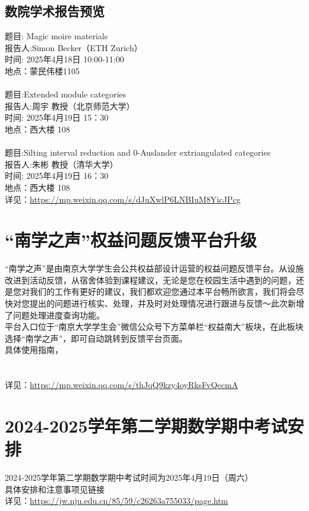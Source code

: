 \documentclass[letterpaper, 12pt]{article}
\begin{document}
\begin{multicols}{2}
\subsection{数院学术报告预览}
题目: Magic moire materials
\\报告人:Simon Becker（ETH Zurich）
\\时间: 2025年4月18日 10:00-11:00
\\地点：蒙民伟楼1105
\\
\\题目:Extended module categories
\\报告人:周宇 教授（北京师范大学）
\\时间: 2025年4月19日 15：30
\\地点：西大楼 108
\\
\\题目:Silting interval reduction and 0-Auslander extriangulated categories
\\报告人:朱彬 教授（清华大学）
\\时间: 2025年4月19日 16：30
\\地点：西大楼 108
\\详见：\url{https://mp.weixin.qq.com/s/dJuXwlP6LNBIuM8YicJPcg}


\section{“南学之声”权益问题反馈平台升级}
“南学之声”是由南京大学学生会公共权益部设计运营的权益问题反馈平台。从设施改进到活动反馈，从宿舍体验到课程建议，无论是您在校园生活中遇到的问题，还是您对我们的工作有更好的建议，我们都欢迎您通过本平台畅所欲言，我们将会尽快对您提出的问题进行核实、处理，并及时对处理情况进行跟进与反馈～此次新增了问题处理进度查询功能。
\\平台入口位于“南京大学学生会”微信公众号下方菜单栏“权益南大”板块，在此板块选择“南学之声”，即可自动跳转到反馈平台页面。
\\具体使用指南，
\\
\\
\\详见：\url{https://mp.weixin.qq.com/s/thJqQ9kzy4oyRksFvQecmA}
\section{2024-2025学年第二学期数学期中考试安排}
2024-2025学年第二学期数学期中考试时间为2025年4月19日（周六）
\\具体安排和注意事项见链接
\\详见：\url{https://jw.nju.edu.cn/85/59/c26263a755033/page.htm}


\end{multicols}
\end{document}
